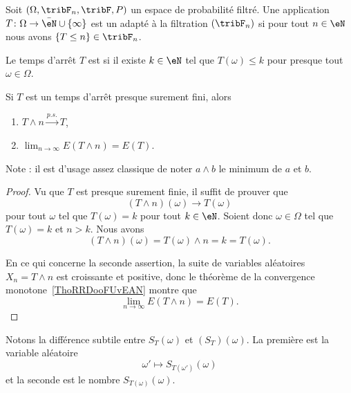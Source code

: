 \begin{definition}
	Soit \( (\Omega,\tribF_n,\tribF,P)\) un espace de probabilité filtré. Une application \( T\colon \Omega\to \bar \eN\cup\{ \infty \}\) est un  adapté à la filtration \( (\tribF_n)\) si pour tout \( n\in \eN\) nous avons \( \{ T\leq n \}\in\tribF_n\).

	Le temps d'arrêt \( T\) est  si il existe \( k\in \eN\) tel que \( T(\omega)\leq k\) pour presque tout \( \omega\in \Omega\).
\end{definition}

\begin{lemma} \label{LemXYeCLXW}
	Si \( T\) est un temps d'arrêt presque surement fini, alors
	\begin{enumerate}
		\item \( T\wedge n\stackrel{p.s.}{\longrightarrow}T\),
		\item   \label{ItemIPPkxmAii}
		      \( \lim_{n\to \infty}  E(T\wedge n)=E(T)\).
	\end{enumerate}
	Note : il est d'usage assez classique de noter \( a\wedge b\) le minimum de \( a\) et \( b\).
\end{lemma}

\begin{proof}
	Vu que \( T \) est presque surement finie, il suffit de prouver que
	\begin{equation}    \label{EqRVoKxsN}
		(T\wedge n)(\omega)\to T(\omega)
	\end{equation}
	pour tout \( \omega\) tel que \( T(\omega)=k\) pour tout \( k\in \eN\). Soient donc \( \omega\in \Omega\) tel que \( T(\omega)=k\) et \( n>k\). Nous avons
	\begin{equation}
		(T\wedge n)(\omega)=T(\omega)\wedge n=k=T(\omega).
	\end{equation}

	En ce qui concerne la seconde assertion, la suite de variables aléatoires \( X_n=T\wedge n\) est croissante et positive, donc le théorème de la convergence monotone~\ref{ThoRRDooFUvEAN} montre que
	\begin{equation}
		\lim_{n\to \infty}E(T\wedge n)=E(T).
	\end{equation}
\end{proof}

\begin{remark}
	Notons la différence subtile entre \( S_T(\omega)\) et \( (S_T)(\omega)\). La première est la variable aléatoire
	\begin{equation}
		\omega'\mapsto S_{T(\omega')}(\omega)
	\end{equation}
	et la seconde est le nombre \( S_{T(\omega)}(\omega)\).
\end{remark}


